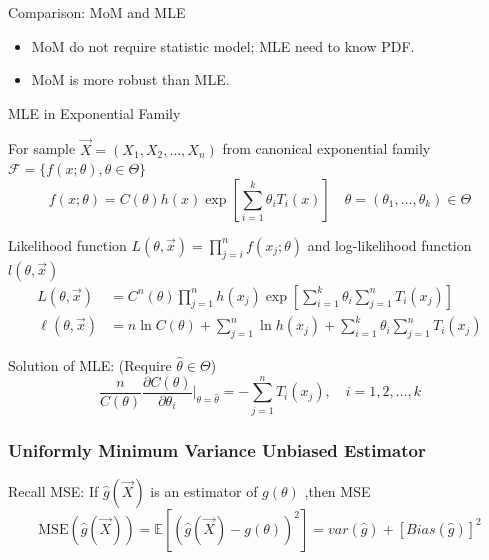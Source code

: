     \begin{point}
        Comparison: MoM and MLE
    \end{point}
    
        
    \begin{itemize}
        \item MoM do not require statistic model; MLE need to know PDF.
        \item MoM is more robust than MLE.
    \end{itemize}


\begin{point}
    MLE in Exponential Family
\end{point}


        For sample $\vec{X}=(X_1,X_2,\ldots,X_n)$ from canonical exponential family $\mathscr{F}=\{f(x;\theta),\theta\in\Theta\}$
        \begin{equation}
            f(x;\theta)=C(\theta)h(x)\exp\left[\sum_{i=1}^k\theta_iT_i(x)\right]\quad \theta=(\theta_1,\ldots,\theta_k)\in\Theta
        \end{equation}

        Likelihood function $L(\theta,\vec{x})=\prod_{j=i}^nf(x_j;\theta)$ and log-likelihood function $l(\theta,\vec{x})$
        \begin{align*}
            L(\theta,\vec{x})&=C^n(\theta)\prod_{j=1}^nh(x_j)\exp\left[\sum_{i=1}^k\theta_i\sum_{j=1}^n T_i(x_j)\right]\\
            \ell(\theta,\vec{x})&=n\ln C(\theta)+\sum_{j=1}^n\ln h(x_j)+\sum_{i=1}^k\theta_i\sum_{j=1}^nT_i(x_j)
        \end{align*}

        Solution of MLE: (Require $\hat{\theta}\in\Theta$)
        \begin{equation}
            \frac{n}{C(\theta)}\frac{\partial C(\theta)}{\partial \theta_i}\bigg|_{\theta=\hat{\theta}}=-\sum_{j=1}^nT_i(x_j),\quad i=1,2,\ldots,k    
        \end{equation}


\subsubsection{Uniformly Minimum Variance Unbiased Estimator}\label{SubSectionUMVUE}
        Recall MSE: If $\hat{g}(\vec{X})$ is an estimator of $g(\theta)$ ,then MSE
        \begin{equation}
            \mathrm{MSE}(\hat{g}(\vec{X}))=\mathbb{E}[(\hat{g}(\vec{X})-g(\theta))^2]=var(\hat{g})+[Bias(\hat{g})]^2
        \end{equation}

